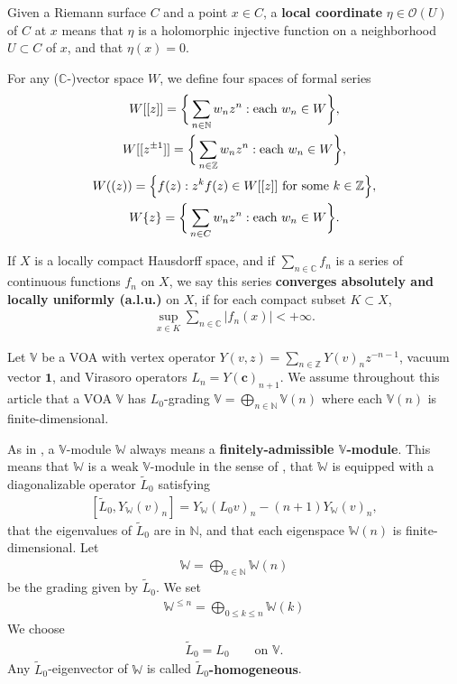 \documentclass[12pt,a4paper,notitlepage]{article}
\theoremstyle{definition}
\theoremstyle{plain}
\newcommand{\wtd}{\widetilde}
\newcommand{\id}{\mathbf{1}}
\newcommand{\scr}{\mathscr}
\newcommand{\mbb}{\mathbb}
\newcommand{\Vbb}{\mathbb V}
\newcommand{\Wbb}{\mathbb W}
\newcommand{\Cbb}{\mathbb C}
\newcommand{\Nbb}{\mathbb N}
\newcommand{\Zbb}{\mathbb Z}
\newcommand{\cbf}{\mathbf c}
\numberwithin{equation}{subsection}
\begin{document}
Given a Riemann surface $C$ and a point $x\in C$, a \textbf{local coordinate} $\eta\in\scr O(U)$ of $C$ at $x$ means that $\eta$ is a holomorphic injective function on a neighborhood $U\subset C$ of $x$, and that $\eta(x)=0$.


For any ($\Cbb$-)vector space $W$, we define four spaces of formal series 
\begin{gather*}
W[[z]]=\bigg\{\sum_{n\in\mathbb N}w_nz^n:\text{each }w_n\in W\bigg\},\\
W[[z^{\pm 1}]]=\bigg\{\sum_{n\in\mathbb Z}w_nz^n:\text{each }w_n\in W\bigg\},\\
W((z))=\Big\{f(z):z^kf(z)\in W[[z]]\text{ for some }k\in\mbb Z \Big\},\\
W\{z\}=\bigg\{\sum_{n\in\mathbb \Cbb}w_nz^n:\text{each }w_n\in W\bigg\}.
\end{gather*}


If $X$ is a locally compact Hausdorff space, and if $\sum_{n\in\Cbb} f_n$ is a series of continuous functions $f_n$ on $X$, we say this series \textbf{converges absolutely and locally uniformly (a.l.u.)} on $X$, if for each compact subset $K\subset X$,
\begin{align}\label{eq10}
\sup_{x\in K}\sum_{n\in\Cbb}|f_n(x)|<+\infty.	
\end{align} 



Let $\Vbb$ be a  VOA with vertex operator $Y(v,z)=\sum_{n\in\Zbb}Y(v)_nz^{-n-1}$, vacuum vector $\id$, and Virasoro operators $L_n=Y(\cbf)_{n+1}$. We assume throughout this article that a VOA $\Vbb$ has $L_0$-grading $\Vbb=\bigoplus_{n\in\Nbb}\Vbb(n)$ where each $\Vbb(n)$ is finite-dimensional.


As in \cite{Gui21b},  a $\Vbb$-module $\Wbb$ always means a \textbf{finitely-admissible $\Vbb$-module}. This means that $\Wbb$ is a weak $\Vbb$-module in the sense of \cite{DLM97}, that $\Wbb$ is equipped with a diagonalizable operator $\wtd L_0$ satisfying \index{L0@$\wtd L_0$}  
\begin{align}\label{eq34}
	[\wtd L_0,Y_\Wbb(v)_n]=Y_\Wbb(L_0 v)_n-(n+1)Y_\Wbb(v)_n,	
\end{align}
that the eigenvalues of $\wtd L_0$ are in $\Nbb$, and that each eigenspace $\Wbb(n)$ is finite-dimensional. Let \index{W@$\Wbb(n),\Wbb_{(n)}$}
\begin{align*}
	\Wbb=\bigoplus_{n\in\Nbb}\Wbb(n)	
\end{align*}
be the grading given by $\wtd L_0$. We set
\begin{align*}
	\Wbb^{\leq n}=\bigoplus_{0\leq k\leq n}	\Wbb{(k)}
\end{align*}
We choose  
\begin{align*}
\wtd L_0=L_0\qquad\text{on }\Vbb.	
\end{align*}
Any $\wtd L_0$-eigenvector of $\Wbb$  is called \textbf{$\wtd L_0$-homogeneous}.
\end{document}
